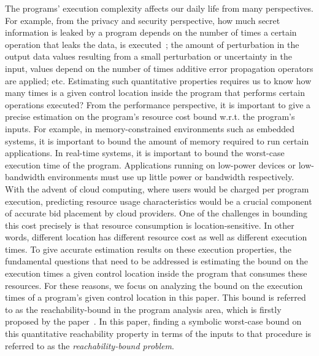 The programs' execution complexity affects our daily life from many perspectives.
For example,
from the privacy and security perspective,
how much secret information is leaked by a program depends on the number of times a certain operation that leaks the data,
is executed~\cite{Malacaria07};
the amount of perturbation in the output data values resulting
from a small perturbation or uncertainty in the input,
values depend on the number of times additive error propagation operators are applied; etc.
Estimating such quantitative properties requires us to know
how many times is a given control location inside the program that performs certain operations executed?
From the performance perspective, it is important to give a precise estimation
on the program's resource cost bound w.r.t. the program's inputs.
For example, in memory-constrained environments such as embedded systems,
it is important to bound the amount of memory required to run certain applications.
In real-time systems, it is important to bound the worst-case execution time of the program.
Applications running on low-power devices or low-bandwidth environments must use up little power or bandwidth respectively. 
With the advent of cloud computing, where users would be charged per program execution,
predicting resource usage characteristics would be a crucial component of accurate bid placement by cloud providers. 
One of the challenges in bounding this cost precisely is that resource consumption is location-sensitive.
In other words, different location has different resource cost as well as different execution times.
To give accurate estimation results on these execution properties,
the fundamental questions that need to be addressed 
is estimating the bound on the execution times
a given control location inside the program that consumes these resources.
For these reasons, we focus on analyzing the bound on the execution times of a program's given control location in this paper.
This bound is referred to as the reachability-bound in the program analysis area,
which is firstly proposed by the paper~\cite{GulwaniZ10}.
In this paper, finding a symbolic worst-case bound on this quantitative reachability property
in terms of the inputs to that procedure
is referred to as the \emph{reachability-bound problem}.

